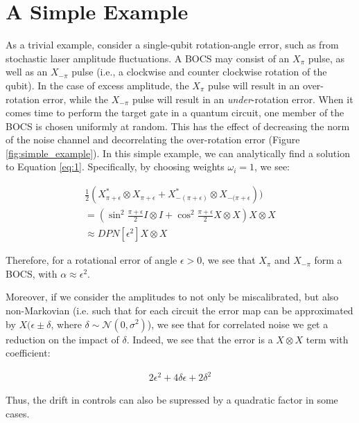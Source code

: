 \documentclass[aps,nofootinbib,pra,notitlepage,twocolumn]{revtex4-1}
\begin{document}
\section{A Simple Example}
As a trivial example, consider a single-qubit rotation-angle error, such as from stochastic laser amplitude fluctuations. A BOCS may consist of an $X_\pi$ pulse, as well as an $X_{-\pi}$ pulse (i.e., a clockwise and counter clockwise rotation of the qubit). In the case of excess amplitude, the $X_\pi$ pulse will result in an over-rotation error, while the $X_{-\pi}$ pulse will result in an \emph{under}-rotation error. When it comes time to perform the target gate in a quantum circuit, one member of the BOCS is chosen uniformly at random. This has the effect of decreasing the norm of the noise channel and decorrelating the over-rotation error (Figure \ref{fig:simple_example}). In this simple example, we can analytically find a solution to Equation \ref{eq:1}. Specifically, by choosing weights $\omega_i=1$, we see:

\begin{equation}
  \begin{gathered}
    \frac{1}{2}(X^*_{\pi + \epsilon}\otimes X_{\pi + \epsilon} + X^*_{-(\pi + \epsilon)}\otimes X_{-(\pi + \epsilon})) \\
    = (\sin^2{\frac{\pi + \epsilon}{2}}I\otimes I + \cos^2{\frac{\pi + \epsilon}{2}}X\otimes X)X\otimes X \\
    \approx DPN[\epsilon^2]X\otimes X
  \end{gathered}
\end{equation}

Therefore, for a rotational error of angle $\epsilon > 0$, we see that $X_\pi$ and  $X_{-\pi}$  form a BOCS, with $\alpha\approx\epsilon^2$.

Moreover, if we consider the amplitudes to not only be miscalibrated, but also non-Markovian (i.e. such that for each circuit the error map can be approximated by $X(\epsilon \pm \delta$, where $\delta\sim\mathcal{N}(0, \sigma^2)$), we see that for correlated noise we get a reduction on the impact of $\delta$. Indeed, we see that the error is a $X\otimes X$ term with  coefficient:

\begin{equation}
  \begin{gathered}
  2\epsilon^2 + 4\delta\epsilon + 2\delta^2
  \end{gathered}
\end{equation}

Thus, the drift in controls can also be supressed by a quadratic factor in some cases.
\end{document}
